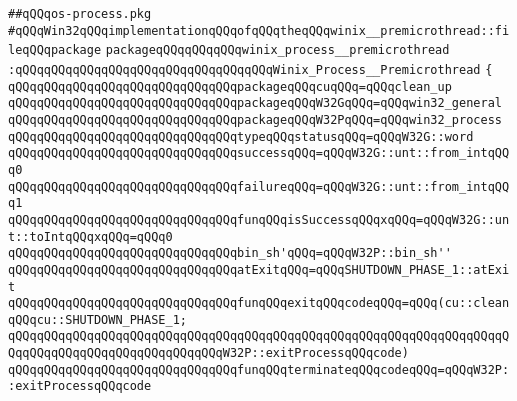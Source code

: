 \label{src/lib/std/src/win32/os-process.pkg}
\verb|##qQQqos-process.pkg|\newline
\newline
\newline
\verb|#qQQqWin32qQQqimplementationqQQqofqQQqtheqQQqwinix__premicrothread::fileqQQqpackage|\newline
\newline
\verb|packageqQQqqQQqqQQqwinix_process__premicrothread|\newline
\verb|:qQQqqQQqqQQqqQQqqQQqqQQqqQQqqQQqqQQqWinix_Process__Premicrothread|\newline
\verb|{|\newline
\verb|qQQqqQQqqQQqqQQqqQQqqQQqqQQqqQQqpackageqQQqcuqQQq=qQQqclean_up|\newline
\verb|qQQqqQQqqQQqqQQqqQQqqQQqqQQqqQQqpackageqQQqW32GqQQq=qQQqwin32_general|\newline
\verb|qQQqqQQqqQQqqQQqqQQqqQQqqQQqqQQqpackageqQQqW32PqQQq=qQQqwin32_process|\newline
\newline
\verb|qQQqqQQqqQQqqQQqqQQqqQQqqQQqqQQqtypeqQQqstatusqQQq=qQQqW32G::word|\newline
\newline
\verb|qQQqqQQqqQQqqQQqqQQqqQQqqQQqqQQqsuccessqQQq=qQQqW32G::unt::from_intqQQq0|\newline
\verb|qQQqqQQqqQQqqQQqqQQqqQQqqQQqqQQqfailureqQQq=qQQqW32G::unt::from_intqQQq1|\newline
\newline
\verb|qQQqqQQqqQQqqQQqqQQqqQQqqQQqqQQqfunqQQqisSuccessqQQqxqQQq=qQQqW32G::unt::toIntqQQqxqQQq=qQQq0|\newline
\newline
\verb|qQQqqQQqqQQqqQQqqQQqqQQqqQQqqQQqbin_sh'qQQq=qQQqW32P::bin_sh''|\newline
\newline
\verb|qQQqqQQqqQQqqQQqqQQqqQQqqQQqqQQqatExitqQQq=qQQqSHUTDOWN_PHASE_1::atExit|\newline
\newline
\verb|qQQqqQQqqQQqqQQqqQQqqQQqqQQqqQQqfunqQQqexitqQQqcodeqQQq=qQQq(cu::cleanqQQqcu::SHUTDOWN_PHASE_1;|\newline
\verb|qQQqqQQqqQQqqQQqqQQqqQQqqQQqqQQqqQQqqQQqqQQqqQQqqQQqqQQqqQQqqQQqqQQqqQQqqQQqqQQqqQQqqQQqqQQqqQQqqQQqW32P::exitProcessqQQqcode)|\newline
\newline
\verb|qQQqqQQqqQQqqQQqqQQqqQQqqQQqqQQqfunqQQqterminateqQQqcodeqQQq=qQQqW32P::exitProcessqQQqcode|\newline
